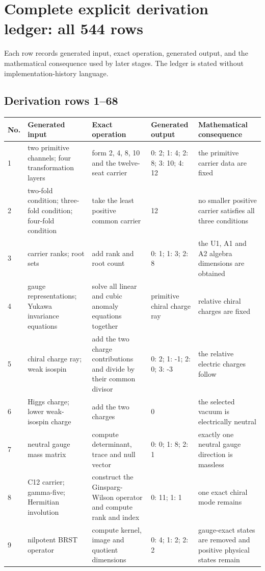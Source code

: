 \documentclass[11pt]{article}
\numberwithin{equation}{section}
\theoremstyle{remark}
\begin{document}
\section{Complete explicit derivation ledger: all 544 rows}
\label{supp:supp:derivations}
Each row records generated input, exact operation, generated output, and the mathematical consequence used by later stages. The ledger is stated without implementation-history language.
\begin{landscape}
\small
\subsection{Derivation rows 1--68}
\begin{longtable}{p{0.65cm}p{3.5cm}p{4.0cm}p{4.0cm}p{4.6cm}}
\toprule No.&Generated input&Exact operation&Generated output&Mathematical consequence\\\midrule\endhead
1&two primitive channels; four transformation layers&form 2, 4, 8, 10 and the twelve-seat carrier&0: 2; 1: 4; 2: 8; 3: 10; 4: 12&the primitive carrier data are fixed\\
2&two-fold condition; three-fold condition; four-fold condition&take the least positive common carrier&12&no smaller positive carrier satisfies all three conditions\\
3&carrier ranks; root sets&add rank and root count&0: 1; 1: 3; 2: 8&the U1, A1 and A2 algebra dimensions are obtained\\
4&gauge representations; Yukawa invariance equations&solve all linear and cubic anomaly equations together&primitive chiral charge ray&relative chiral charges are fixed\\
5&chiral charge ray; weak isospin&add the two charge contributions and divide by their common divisor&0: 2; 1: -1; 2: 0; 3: -3&the relative electric charges follow\\
6&Higgs charge; lower weak-isospin charge&add the two charges&0&the selected vacuum is electrically neutral\\
7&neutral gauge mass matrix&compute determinant, trace and null vector&0: 0; 1: 8; 2: 1&exactly one neutral gauge direction is massless\\
8&C12 carrier; gamma-five; Hermitian involution&construct the Ginsparg-Wilson operator and compute rank and index&0: 11; 1: 1&one exact chiral mode remains\\
9&nilpotent BRST operator&compute kernel, image and quotient dimensions&0: 4; 1: 2; 2: 2&gauge-exact states are removed and positive physical states remain\\

\end{longtable}
\end{landscape}
\end{document}
